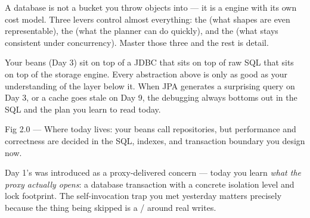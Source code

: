 \begin{keyidea}
A database is not a bucket you throw objects into --- it is a  engine with its own cost model. Three levers control almost everything: the  (what shapes are even representable), the  (what the planner can do quickly), and the  (what stays consistent under concurrency). Master those three and the rest is detail.
\end{keyidea}

 Your  beans (Day 3) sit on top of a JDBC  that sits on top of raw SQL that sits on top of the storage engine. Every abstraction above is only as good as your understanding of the layer below it. When JPA generates a surprising query on Day 3, or a cache goes stale on Day 9, the debugging always bottoms out in the SQL and the plan you learn to read today.

\begin{wbfigure}{Fig 2.0 — Where today lives: your beans call repositories, but performance and correctness are decided in the SQL, indexes, and transaction boundary you design now.}
\end{wbfigure}

 Day 1's  was introduced as a proxy-delivered concern --- today you learn \emph{what the proxy actually opens}: a database transaction with a concrete isolation level and lock footprint. The self-invocation trap you met yesterday matters precisely because the thing being skipped is a / around real writes.

